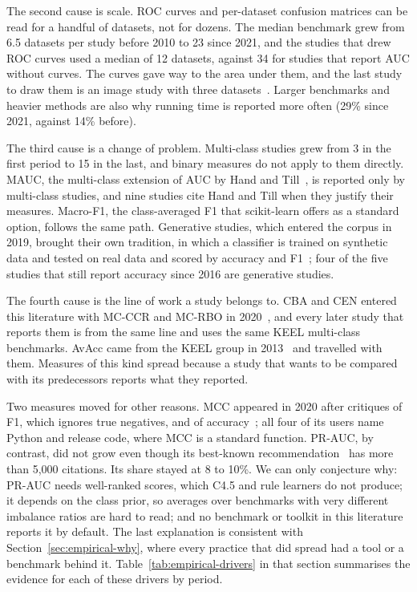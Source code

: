 The second cause is scale. ROC curves and per-dataset confusion matrices can be read for a handful of datasets, not for dozens. The median benchmark grew from 6.5 datasets per study before 2010 to 23 since 2021, and the studies that drew ROC curves used a median of 12 datasets, against 34 for studies that report AUC without curves. The curves gave way to the area under them, and the last study to draw them is an image study with three datasets~\parencite{buda2018systematic}. Larger benchmarks and heavier methods are also why running time is reported more often (29\% since 2021, against 14\% before).

The third cause is a change of problem. Multi-class studies grew from 3 in the first period to 15 in the last, and binary measures do not apply to them directly. MAUC, the multi-class extension of AUC by Hand and Till~\parencite{hand2001simple}, is reported only by multi-class studies, and nine studies cite Hand and Till when they justify their measures. Macro-F1, the class-averaged F1 that scikit-learn offers as a standard option, follows the same path. Generative studies, which entered the corpus in 2019, brought their own tradition, in which a classifier is trained on synthetic data and tested on real data and scored by accuracy and F1~\parencite{xu2019ctgan,kim2022sos,ren2025goio,ren2026dgot}; four of the five studies that still report accuracy since 2016 are generative studies.

The fourth cause is the line of work a study belongs to. CBA and CEN entered this literature with MC-CCR and MC-RBO in 2020~\parencite{koziarski2020mcccr,krawczyk2020mcrbo}, and every later study that reports them is from the same line and uses the same KEEL multi-class benchmarks. AvAcc came from the KEEL group in 2013~\parencite{fernandez2013analysing} and travelled with them. Measures of this kind spread because a study that wants to be compared with its predecessors reports what they reported.

Two measures moved for other reasons. MCC appeared in 2020 after critiques of F1, which ignores true negatives, and of accuracy~\parencite{boughorbel2017optimal}; all four of its users name Python and release code, where MCC is a standard function. PR-AUC, by contrast, did not grow even though its best-known recommendation~\parencite{saito2015precision} has more than 5,000 citations. Its share stayed at 8 to 10\%. We can only conjecture why: PR-AUC needs well-ranked scores, which C4.5 and rule learners do not produce; it depends on the class prior, so averages over benchmarks with very different imbalance ratios are hard to read; and no benchmark or toolkit in this literature reports it by default. The last explanation is consistent with Section~\ref{sec:empirical-why}, where every practice that did spread had a tool or a benchmark behind it. Table~\ref{tab:empirical-drivers} in that section summarises the evidence for each of these drivers by period.

